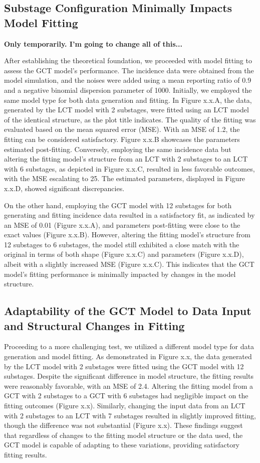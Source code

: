 \documentclass[12pt]{article}
\begin{document}
\subsection{Substage Configuration Minimally Impacts Model Fitting}
\textbf{Only temporarily. I'm going to change all of this...}

After establishing the theoretical foundation, we proceeded with model fitting to assess the GCT model's performance. The incidence data were obtained from the model simulation, and the noises were added using a mean reporting ratio of 0.9 and a negative binomial dispersion parameter of 1000. Initially, we employed the same model type for both data generation and fitting. In Figure x.x.A, the data, generated by the LCT model with 2 substages, were fitted using an LCT model of the identical structure, as the plot title indicates. The quality of the fitting was evaluated based on the mean squared error (MSE). With an MSE of 1.2, the fitting can be considered satisfactory. Figure x.x.B showcases the parameters estimated post-fitting. Conversely, employing the same incidence data but altering the fitting model's structure from an LCT with 2 substages to an LCT with 6 substages, as depicted in Figure x.x.C, resulted in less favorable outcomes, with the MSE escalating to 25. The estimated parameters, displayed in Figure x.x.D, showed significant discrepancies. 

On the other hand, employing the GCT model with 12 substages for both generating and fitting incidence data resulted in a satisfactory fit, as indicated by an MSE of 0.01 (Figure x.x.A), and parameters post-fitting were close to the exact values (Figure x.x.B). However, altering the fitting model's structure from 12 substages to 6 substages, the model still exhibited a close match with the original in terms of both shape (Figure x.x.C) and parameters (Figure x.x.D), albeit with a slightly increased MSE (Figure x.x.C). This indicates that the GCT model's fitting performance is minimally impacted by changes in the model structure.

\subsection{Adaptability of the GCT Model to Data Input and Structural Changes in Fitting}
Proceeding to a more challenging test, we utilized a different model type for data generation and model fitting. As demonstrated in Figure x.x, the data generated by the LCT model with 2 substages were fitted using the GCT model with 12 substages. Despite the significant difference in model structure, the fitting results were reasonably favorable, with an MSE of 2.4. Altering the fitting model from a GCT with 2 substages to a GCT with 6 substages had negligible impact on the fitting outcomes (Figure x.x). Similarly, changing the input data from an LCT with 2 substages to an LCT with 7 substages resulted in slightly improved fitting, though the difference was not substantial (Figure x.x). These findings suggest that regardless of changes to the fitting model structure or the data used, the GCT model is capable of adapting to these variations, providing satisfactory fitting results.
\end{document}
